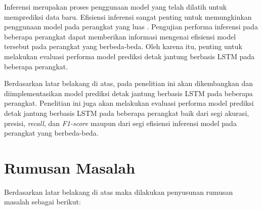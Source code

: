 Inferensi merupakan proses penggunaan model yang telah dilatih untuk memprediksi data baru. 
Efisiensi inferensi sangat penting untuk memungkinkan penggunaan model pada perangkat yang luas \parencite{ulkerReviewingInferencePerformance2020}. 
Pengujian performa inferensi pada beberapa perangkat dapat memberikan informasi mengenai efisiensi model tersebut pada perangkat yang berbeda-beda.
Oleh karena itu, penting untuk melakukan evaluasi performa model prediksi detak jantung berbasis LSTM pada beberapa perangkat.

Berdasarkan latar belakang di atas, pada penelitian ini akan dikembangkan dan diimplementasikan model prediksi detak jantung berbasis LSTM pada beberapa perangkat.
Penelitian ini juga akan melakukan evaluasi performa model prediksi detak jantung berbasis LSTM pada beberapa perangkat baik dari segi akurasi, presisi, \emph{recall}, dan \emph{F1-score} maupun dari segi efisiensi inferensi model pada perangkat yang berbeda-beda.





\section{Rumusan Masalah}

Berdasarkan latar belakang di atas maka dilakukan penyusunan rumusan masalah sebagai berikut:

